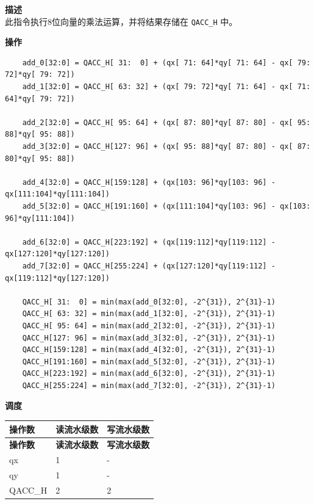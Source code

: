 \textbf{描述}\\
此指令执行8位向量的乘法运算，并将结果存储在 \lstinline{QACC_H} 中。

\textbf{操作}\\
\begin{lstlisting}
    add_0[32:0] = QACC_H[ 31:  0] + (qx[ 71: 64]*qy[ 71: 64] - qx[ 79: 72]*qy[ 79: 72])
    add_1[32:0] = QACC_H[ 63: 32] + (qx[ 79: 72]*qy[ 71: 64] - qx[ 71: 64]*qy[ 79: 72])

    add_2[32:0] = QACC_H[ 95: 64] + (qx[ 87: 80]*qy[ 87: 80] - qx[ 95: 88]*qy[ 95: 88])
    add_3[32:0] = QACC_H[127: 96] + (qx[ 95: 88]*qy[ 87: 80] - qx[ 87: 80]*qy[ 95: 88])

    add_4[32:0] = QACC_H[159:128] + (qx[103: 96]*qy[103: 96] - qx[111:104]*qy[111:104])
    add_5[32:0] = QACC_H[191:160] + (qx[111:104]*qy[103: 96] - qx[103: 96]*qy[111:104])

    add_6[32:0] = QACC_H[223:192] + (qx[119:112]*qy[119:112] - qx[127:120]*qy[127:120])
    add_7[32:0] = QACC_H[255:224] + (qx[127:120]*qy[119:112] - qx[119:112]*qy[127:120])

    QACC_H[ 31:  0] = min(max(add_0[32:0], -2^{31}), 2^{31}-1)
    QACC_H[ 63: 32] = min(max(add_1[32:0], -2^{31}), 2^{31}-1)
    QACC_H[ 95: 64] = min(max(add_2[32:0], -2^{31}), 2^{31}-1)
    QACC_H[127: 96] = min(max(add_3[32:0], -2^{31}), 2^{31}-1)
    QACC_H[159:128] = min(max(add_4[32:0], -2^{31}), 2^{31}-1)
    QACC_H[191:160] = min(max(add_5[32:0], -2^{31}), 2^{31}-1)
    QACC_H[223:192] = min(max(add_6[32:0], -2^{31}), 2^{31}-1)
    QACC_H[255:224] = min(max(add_7[32:0], -2^{31}), 2^{31}-1)

\end{lstlisting}

\textbf{调度}\\
\begin{longtable}[c]{|l|l|l|}
    \hline
    \rowcolor{lightgray}
    \textbf{操作数} & \textbf{读流水级数} & \textbf{写流水级数} \\\hline
    \endfirsthead
    \hline
    \rowcolor{lightgray}
     \textbf{操作数} & \textbf{读流水级数} & \textbf{写流水级数} \\\hline
    \endhead
    \hline
    \endfoot

     qx & 1 & - \\\hline
     qy & 1 & - \\\hline
     QACC\_H & 2 & 2

\end{longtable}

